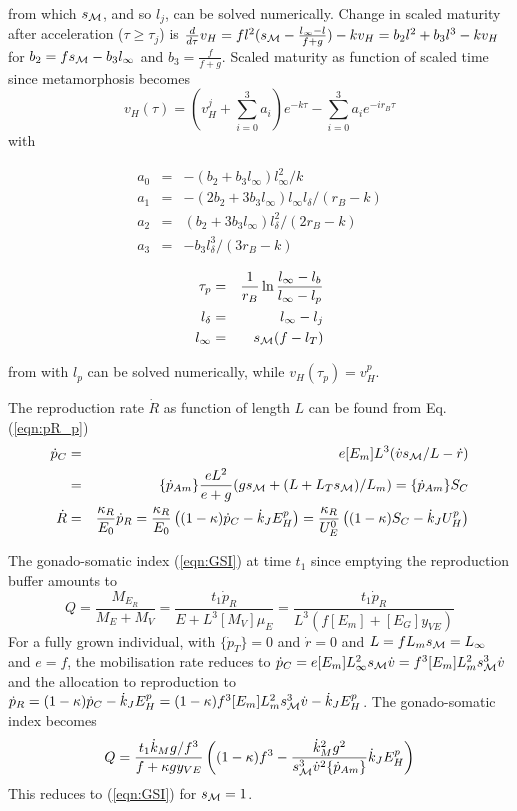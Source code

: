 from which $s_{\cal M}$, and so $l_j$, can be solved numerically.
Change in scaled maturity after acceleration ($\tau \ge \tau_j$) is $\frac{d} {d \tau} v_H = f l^2 (s_{\cal M} - \frac{l_\infty - l} {f + g}) - k v_H = b_2 l^2 + b_3 l^3 - k v_H$ for $b_2 = f s_{\cal M} - b_3 l_\infty$ and $b_3 = \frac{f} {f + g}$. Scaled maturity as function of scaled time since metamorphosis becomes
\[
  v_H(\tau) = \left( v_H^j + \sum_{i = 0}^3 a_i \right) e^{- k \tau} - \sum_{i = 0}^3 a_i e^{- i r_B \tau}
\]
with
\parbox[t]{8cm}{
\begin{eqnarray*}
  a_0 &=& - (b_2 + b_3 l_\infty) l_\infty^2 / k\\
  a_1 &=& -(2 b_2 + 3 b_3 l_\infty) l_\infty l_\delta / (r_B -k)\\
  a_2 &=& (b_2 + 3 b_3 l_\infty) l_\delta^2 / (2r_B - k)\\
  a_3 &=& - b_3 l_\delta^3 / (3r_B - k)
\end{eqnarray*}}
\parbox[t]{8cm}{
\begin{eqnarray*}
	\tau_p &=& \frac{1} {r_B} \ln \frac{l_\infty - l_b} {l_\infty - l_p}\\
	l_\delta &=& l_\infty - l_j\\
	l_\infty &=& s_{\cal M} (f - l_T)
\end{eqnarray*}}
from with $l_p$ can be solved numerically, while $v_H(\tau_p) = v_H^p$.

The reproduction rate $\dot{R}$ as function of length $L$ can be found from Eq. (\ref{eqn:pR_p})
\begin{eqnarray*}
  \dot{p}_C &=& e [E_m] L^3 (\dot{v} s_{\cal M}/ L - \dot{r}) 
  \\ 
  &=& \{\dot{p}_{Am}\} \frac{e L^2} {e + g} (g s_{\cal M} + (L + L_T s_{\cal M})/ L_m) = \{\dot{p}_{Am}\} S_C
  \\
  \dot{R} &=& \frac{\kappa_R} {E_0} \dot{p}_R = \frac{\kappa_R} {E_0} \left( (1 - \kappa) \dot{p}_C - \dot{k}_J E_H^p \right)
  = \frac{\kappa_R} {U_E^0} \left( (1 - \kappa) S_C - \dot{k}_J U_H^p \right)
\end{eqnarray*}


The gonado-somatic index (\ref{eqn:GSI}) at time $t_1$ since emptying the reproduction buffer amounts to 
\[
  Q = \frac{M_{E_R}} {M_E + M_V} = \frac{t_1 \dot{p}_R} {E + L^3 [M_V] \mu_E} = \frac{t_1 \dot{p}_R} {L^3 (f [E_m] + [E_G] y_{VE})}
\]
For a fully grown individual, with $\{\dot{p}_T\} = 0$ and $\dot{r} = 0$ and $L = f L_m s_{\cal M} = L_\infty$ and $e = f$, the mobilisation rate reduces to $\dot{p}_C = e [E_m] L_\infty^2 s_{\cal M} \dot{v} = f^3 [E_m] L_m^2 s_{\cal M}^3 \dot{v}$ and the allocation to reproduction to $\dot{p}_R = (1 - \kappa) \dot{p}_C - \dot{k}_J E_H^p  = (1 - \kappa) f^3 [E_m] L_m^2 s_{\cal M}^3 \dot{v} - \dot{k}_J E_H^p$.
The gonado-somatic index becomes
\[
  Q = \frac{t_1 \dot{k}_M g/ f^3} {f  + \kappa g y_{VE}} \left( (1 - \kappa) f^3 - \frac{\dot{k}_M^2 g^2} {s_{\cal M}^3 \dot{v}^2 \{\dot{p}_{Am}\}} \dot{k}_J E_H^p \right) 
\]
This reduces to (\ref{eqn:GSI}) for $s_{\cal M} = 1$.

